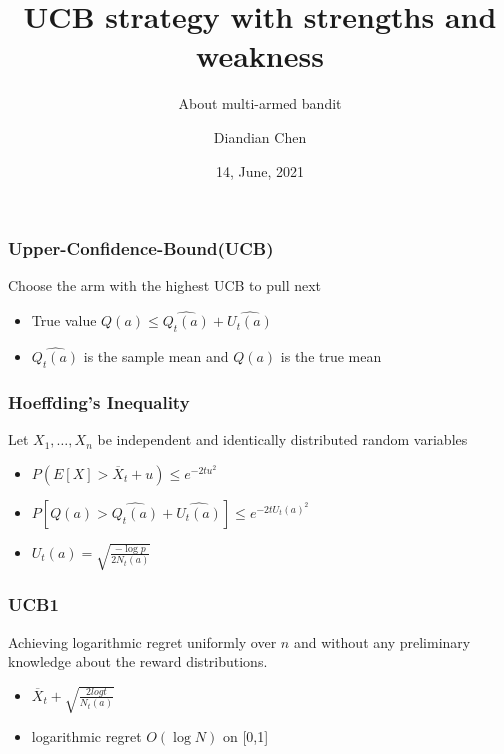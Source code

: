 \documentclass{beamer}
\title[UCB] %
{UCB strategy with strengths and weakness}
\subtitle{About multi-armed bandit}
\author[Diandian Chen] %
{Diandian Chen}
\institute[VFU] %
{
    Faculty of Mathematics \\
    Imperial College London
}
\date[2021] %
{14, June, 2021}
\begin{document}
    \frame{\titlepage}


    \begin{frame}
        \frametitle{Upper-Confidence-Bound(UCB)}
        Choose the arm with the highest UCB to pull next

        \begin{itemize}
            \item<1-> True value $ Q(a)  \leq \widehat{Q_t (a)}+\widehat{U_t (a)} $
            \item<2->  $ \widehat{Q_t (a)}$ is the sample mean and $ Q(a)$ is the true mean
        \end{itemize}
    \end{frame}



    \begin{frame}
        \frametitle{Hoeffding’s Inequality}
        Let $X_1, \dots, X_n$ be independent and identically distributed random variables

        \begin{itemize}
            \item<1-> $ P(E[X] > \overline  X_t + u) \leq e^{-2t u^2}$
            \item<2-> $P[Q(a) >\widehat{Q_t (a)}+\widehat{U_t (a)}] \leq e^{-2t U_t(a)^2}$
            \item<3-> $U_t(a) = \sqrt{\frac{-\log p}{2N_t (a)}}$
        \end{itemize}
    \end{frame}



    \begin{frame}
        \frametitle{UCB1}
        Achieving logarithmic regret uniformly over $n$ and without any preliminary knowledge about the reward distributions.

        \begin{itemize}
            \item<1-> $\overline X_t + \sqrt{\frac{2log t}{N_t (a)}}$
            \item<2-> logarithmic regret $O(\log N)$ on [0,1]

        \end{itemize}
    \end{frame}
\end{document}
